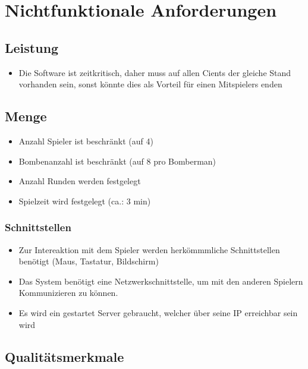\documentclass[11pt]{scrartcl}
\begin{document}
\section{Nichtfunktionale Anforderungen}
\label{sec:Nicht funktionale Anforderungen}

\subsection{Leistung}
\label{sec:leistung}
\begin{itemize}
    \item Die Software ist zeitkritisch, daher muss auf allen Cients der gleiche Stand vorhanden sein, sonst könnte dies als Vorteil für einen Mitspielers enden
    
\end{itemize}


\subsection{Menge}
\label{sec:Menge}
\begin{itemize}
    \item Anzahl Spieler ist beschränkt (auf 4)
    \item Bombenanzahl ist beschränkt (auf 8 pro Bomberman)
    \item Anzahl Runden werden festgelegt
    \item Spielzeit wird festgelegt (ca.: 3 min)
\end{itemize}



\subsubsection{Schnittstellen}
\label{sec:Schnittstellen}
\begin{itemize}
    \item Zur Intereaktion mit dem Spieler werden herkömmmliche Schnittstellen benötigt (Maus, Tastatur, Bildschirm)
    \item Das System benötigt eine Netzwerkschnittstelle, um mit den anderen Spielern Kommunizieren zu können.
    \item Es wird ein gestartet Server gebraucht, welcher über seine IP erreichbar sein wird
\end{itemize}

\subsection{Qualitätsmerkmale}
\label{sec:Qualitätsmermale}
\end{document}
